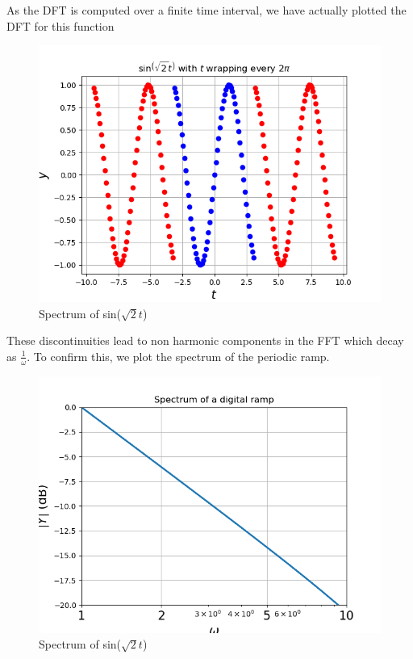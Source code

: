 \documentclass[11pt, a4paper]{article}
\begin{document}
As the DFT is computed over a finite time interval, we have actually plotted the DFT for this function
\begin{figure}[h!]
\centering
\includegraphics[scale=0.6]{fig2.png}
\caption{Spectrum of sin($\sqrt{2}t$)}
\label{fig:universe}
\end{figure}

These discontinuities lead to  non harmonic components in the FFT which decay as \(\frac{1}{\omega}\). To confirm
this, we plot the spectrum of the periodic ramp.
\begin{figure}[h!]
\centering
\includegraphics[scale=0.6]{fig3.png}
\caption{Spectrum of sin($\sqrt{2}t$)}
\label{fig:universe}
\end{figure}
\end{document}
